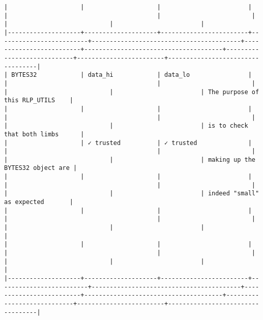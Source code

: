 \documentclass[varwidth=\maxdimen,margin=0.5cm,multi={verbatim}]{standalone}
\begin{document}
\begin{verbatim}
|                    |                    |                        |                         |                                         |                         |                                      |                            |                        |
|--------------------+--------------------+------------------------+-------------------------+-----------------------------------------+-------------------------+--------------------------------------+----------------------------+------------------------+----------------------------------|
| BYTES32            | data_hi            | data_lo                |                         |                                         |                         |                                      |                            |                        | The purpose of this RLP_UTILS    |
|                    |                    |                        |                         |                                         |                         |                                      |                            |                        | is to check that both limbs      |
|                    | ✓ trusted          | ✓ trusted              |                         |                                         |                         |                                      |                            |                        | making up the BYTES32 object are |
|                    |                    |                        |                         |                                         |                         |                                      |                            |                        | indeed "small" as expected       |
|                    |                    |                        |                         |                                         |                         |                                      |                            |                        |                                  |
|                    |                    |                        |                         |                                         |                         |                                      |                            |                        |                                  |
|--------------------+--------------------+------------------------+-------------------------+-----------------------------------------+-------------------------+--------------------------------------+----------------------------+------------------------+----------------------------------|

\end{verbatim}
\end{document}

